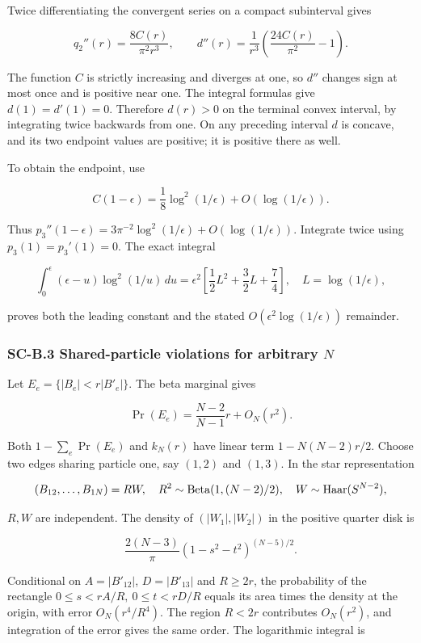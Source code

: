 \documentclass[a4paper,11pt]{article}
\numberwithin{equation}{section}
\begin{document}
Twice differentiating the convergent series on a compact subinterval gives

\[
q_2''(r)=\frac{8C(r)}{\pi^2r^3},\qquad
d''(r)=\frac1{r^3}\left(\frac{24C(r)}{\pi^2}-1\right).
\]

The function \(C\) is strictly increasing and diverges at one, so \(d''\) changes sign at most once and is positive near one. The integral formulas give \(d(1)=d'(1)=0\). Therefore \(d(r)>0\) on the terminal convex interval, by integrating twice backwards from one. On any preceding interval \(d\) is concave, and its two endpoint values are positive; it is positive there as well.

To obtain the endpoint, use

\[
C(1-\epsilon)=\frac18\log^2(1/\epsilon)+O(\log(1/\epsilon)).
\]

Thus \(p_3''(1-\epsilon)=3\pi^{-2}\log^2(1/\epsilon)+O(\log(1/\epsilon))\). Integrate twice using \(p_3(1)=p_3'(1)=0\). The exact integral

\[
\int_0^\epsilon(\epsilon-u)\log^2(1/u)\,du
=\epsilon^2\left[\frac12L^2+\frac32L+\frac74\right],
\quad L=\log(1/\epsilon),
\]

proves both the leading constant and the stated \(O(\epsilon^2\log(1/\epsilon))\) remainder.

\hypertarget{sc-b.3-shared-particle-violations-for-arbitrary-n}{%
\subsubsection{\texorpdfstring{SC-B.3 Shared-particle violations for arbitrary \(N\)}{SC-B.3 Shared-particle violations for arbitrary N}}\label{sc-b.3-shared-particle-violations-for-arbitrary-n}}

Let \(E_e=\{|B_e|<r|B'_e|\}\). The beta marginal gives

\[
\Pr(E_e)=\frac{N-2}{N-1}r+O_N(r^2).
\]

Both \(1-\sum_e\Pr(E_e)\) and \(k_N(r)\) have linear term \(1-N(N-2)r/2\). Choose two edges sharing particle one, say \((1,2)\) and \((1,3)\). In the star representation

\[
(B_{12},\ldots,B_{1N})=RW,\quad
R^2\sim\operatorname{Beta}(1,(N-2)/2),\quad W\sim{\rm Haar}(S^{N-2}),
\]

\(R,W\) are independent. The density of \((|W_1|,|W_2|)\) in the positive quarter disk is

\[
\frac{2(N-3)}{\pi}(1-s^2-t^2)^{(N-5)/2}.
\]

Conditional on \(A=|B'_{12}|\), \(D=|B'_{13}|\) and \(R\geq2r\), the probability of the rectangle \(0\leq s<rA/R,\ 0\leq t<rD/R\) equals its area times the density at the origin, with error \(O_N(r^4/R^4)\). The region \(R<2r\) contributes \(O_N(r^2)\), and integration of the error gives the same order. The logarithmic integral is
\end{document}
